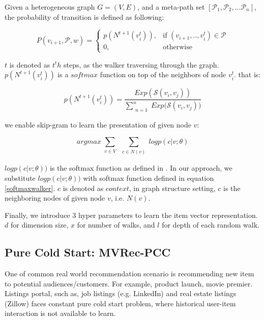 Given a heterogeneous graph $G = (V,E)$, and a meta-path set $[\mathcal{P}_1, \mathcal{P}_2, ... \mathcal{P}_n]$, the probability of transition is defined as following:

\begin{equation}\label{hetewalker}
    P(v_{i+1},\mathcal{P},w)= 
        \begin{cases}
            p({N^{t+1}(v_{i}^t)}),& \text{if } (v_{i+1}, .., v_{i}^t) \in \mathcal{P} \\
            0,              & \text{otherwise}
        \end{cases}
\end{equation}

$t$ is denoted as $t^th$ steps, as the walker traversing through the graph.
$p({N^{t+1}(v_{i}^t)})$ is a $softmax$ function on top of the neighbors of node $v_{i}^t$. 
that is:

\begin{equation}\label{softmaxwalker}
    p({N^{t+1}(v_{i}^t)}) = \frac{Exp(\mathcal{S}(v_i,v_j))}{\sum\limits_{\substack{n=1}}^{n} {Exp(\mathcal{S}(v_i,v_j)})}
\end{equation}

we enable skip-gram to learn the presentation of given node $v$:

\begin{equation}\label{skipgram}
    arg max
    \sum\limits_{\substack{v \in V}}
    \sum\limits_{\substack{c \in N(v)}}
    log p({c|v;\theta})
\end{equation}

$log p({c|v;\theta}))$ is the softmax function as defined in \cite{mikolov2013distributed} \cite{mikolov2013efficient}. In our approach, we substitute $log p({c|v;\theta}))$ with softmax function defined in equation \ref{softmaxwalker}. $c$ is denoted as $context$, in graph structure setting, $c$ is the neighboring nodes of given node $v$, i.e. $N(v)$. 

Finally, we introduce 3 hyper parameters to learn the item vector representation. $d$ for dimension size, $x$ for number of walks, and $l$ for depth of each random walk. 


\subsection{Pure Cold Start: MVRec-PCC}\label{3PCC}
One of common real world recommendation scenario is recommending new item to potential audiences/customers. For example, product launch, movie premier. Listings portal, such as, job listings (e.g. LinkedIn) and real estate listings (Zillow) faces constant pure cold start problem, where historical user-item interaction is not available to learn. 

